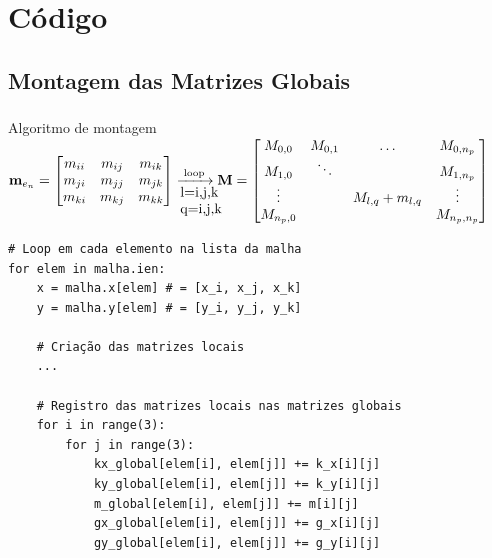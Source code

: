 \documentclass{beamer}
\begin{document}
\section{Código}
\subsection{Montagem das Matrizes Globais}
\begin{frame}[fragile]
  \frametitle{\subsecname}
  
  \begin{block}{Algoritmo de montagem}
  \fontsize{6pt}{7.2}\selectfont
  \centering
    $
    \mathbf{m}_{e_n}
    =
    \begin{bmatrix}
      m_{ii} & m_{ij} & m_{ik} \\
      m_{ji} & m_{jj} & m_{jk} \\
      m_{ki} & m_{kj} & m_{kk}
    \end{bmatrix}
    \xrightarrow[\parbox{0.7cm}{l=i,j,k q=i,j,k}]{\text{loop}}
    \mathbf{M}
    =
    \begin{bmatrix}
      M_{0,0} & M_{0,1} & \ldots & M_{0,n_p} \\
      M_{1,0} & \ddots & & M_{1,n_p} \\
      \vdots & & M_{l,q} + m_{l,q} & \vdots \\
      M_{n_p, 0} & & & M_{n_p,n_p}
    \end{bmatrix}
    $
    
    \begin{verbatim}
# Loop em cada elemento na lista da malha
for elem in malha.ien:
    x = malha.x[elem] # = [x_i, x_j, x_k]
    y = malha.y[elem] # = [y_i, y_j, y_k]

    # Criação das matrizes locais
    ...

    # Registro das matrizes locais nas matrizes globais
    for i in range(3):
        for j in range(3):
            kx_global[elem[i], elem[j]] += k_x[i][j]
            ky_global[elem[i], elem[j]] += k_y[i][j]
            m_global[elem[i], elem[j]] += m[i][j]
            gx_global[elem[i], elem[j]] += g_x[i][j]
            gy_global[elem[i], elem[j]] += g_y[i][j]
    \end{verbatim}
  \end{block}
\end{frame}
\end{document}

